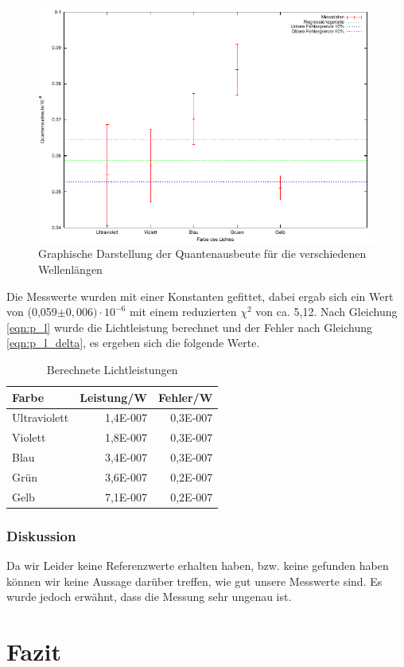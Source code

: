 \documentclass[12px]{scrartcl}
\begin{document}
\begin{figure}[H]
\centering
    \includegraphics[scale = 1]{a_2_2.pdf}
  	\caption[Graphische Darstellung der Quantenausbeute für die verschiedenen Wellenlängen]{Graphische Darstellung der Quantenausbeute für die verschiedenen Wellenlängen}
  \label{fig:a_2_3}
\end{figure}

Die Messwerte wurden mit einer Konstanten gefittet, dabei ergab sich ein Wert von (0,059$\pm 0,006)\cdot10^{-6}$ mit einem reduzierten $\chi^2$ von ca. 5,12. Nach Gleichung \ref{eqn:p_l} wurde die Lichtleistung berechnet und der Fehler nach Gleichung \ref{eqn:p_l_delta}, es ergeben sich die folgende Werte.

\begin{table}[H]
\caption{Berechnete Lichtleistungen}
\begin{center}
\begin{tabular}{|l|r|r|}
\hline
Farbe & \multicolumn{1}{l|}{Leistung/W} & \multicolumn{1}{l|}{Fehler/W} \\ \hline
Ultraviolett & 1,4E-007 & 0,3E-007 \\ \hline
Violett & 1,8E-007 & 0,3E-007 \\ \hline
Blau & 3,4E-007 & 0,3E-007 \\ \hline
Grün & 3,6E-007 & 0,2E-007 \\ \hline
Gelb & 7,1E-007 & 0,2E-007 \\ \hline
\end{tabular}
\end{center}
\label{tab:a_2_3_l}
\end{table}


\subsubsection{Diskussion}
Da wir Leider keine Referenzwerte erhalten haben, bzw. keine gefunden haben können wir keine Aussage darüber treffen, wie gut unsere Messwerte sind. Es wurde jedoch erwähnt, dass die Messung sehr ungenau ist.

\section{Fazit}

\end{document}
